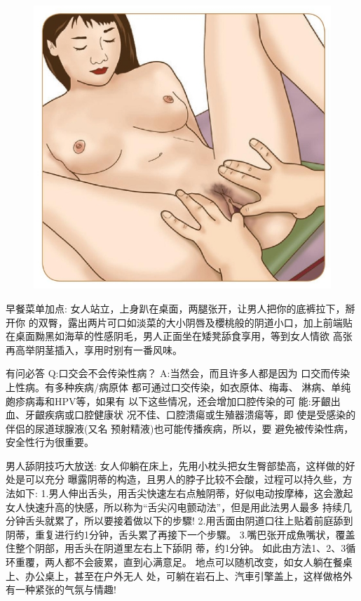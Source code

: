 \documentclass[12pt,UTF8]{ctexbook}
\begin{document}
\begin{figure}[htbp]
	\centering
	\includegraphics[width=0.7\linewidth]{23}
	\caption{}
	\label{fig:1}
\end{figure}

早餐菜单加点:
女人站立，上身趴在桌面，两腿张开，让男人把你的底裤拉下，掰开你
的双臀，露出两片可口如淡菜的大小阴唇及櫻桃般的阴道小口，加上前端贴
在桌面黝黑如海草的性感阴毛，男人正面坐在矮凳舔食享用，等到女人情欲
高张再高举阴茎插入，享用时别有一番风味。

有问必答
Q:口交会不会传染性病？
A:当然会，而且许多人都是因为
口交而传染上性病。有多种疾病/病原体
都可通过口交传染，如衣原体、梅毒、
淋病、单纯皰疹病毒和HPV等，如果有
以下这些情况，还会增加口腔传染的可
能:牙齦出血、牙齦疾病或口腔健康状
况不佳、口腔溃瘍或生殖器溃瘍等，即
使是受感染的伴侣的尿道球腺液(又名
预射精液)也可能传播疾病，所以，要
避免被传染性病，安全性行为很重要。

男人舔阴技巧大放送:
女人仰躺在床上，先用小枕头把女生臀部垫高，这样做的好处是可以充分
曝露阴蒂的构造，且男人的脖子比较不会酸，过程可以持久些，方法如下:
1.男人伸出舌头，用舌尖快速左右点触阴蒂，好似电动按摩棒，这会激起
女人快速升高的快感，所以称为“舌尖闪电颤动法”，但是用此法男人最多
持续几分钟舌头就累了，所以要接着做以下的步驟!
2.用舌面由阴道口往上贴着前庭舔到阴蒂，重复进行约1分钟，舌头累了再接下一个步驟。
3.嘴巴张开成魚嘴状，覆盖住整个阴部，用舌头在阴道里左右上下舔阴
蒂，约1分钟。
如此由方法1、2、3循环重覆，两人都不会疲累，直到心满意足。
地点可以随机改变，如女人躺在餐桌上、办公桌上，甚至在户外无人
处，可躺在岩石上、汽車引擎盖上，这样做格外有一种紧张的气氛与情趣!
\end{document}
